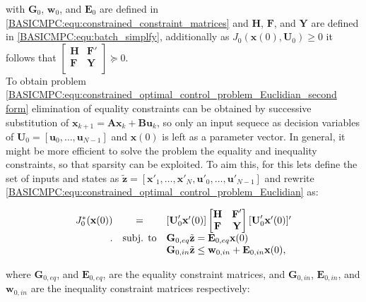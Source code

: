     with $\textbf{G}_0$, $\textbf{w}_0$, and $\textbf{E}_0$ are defined in \ref{BASICMPC:equ:constrained_constraint_matrices} and $\textbf{H}$, $\textbf{F}$, and $\textbf{Y}$ are defined in \ref{BASICMPC:equ:batch_simplfy}, additionally as $J_0(\textbf{x}(0),\textbf{U}_0)\geq 0$ it follows that $\begin{bmatrix}
            \textbf{H}&\textbf{F}'\\
            \textbf{F}&\textbf{Y}\\
            \end{bmatrix}\succeq 0$.\\
    To obtain problem \ref{BASICMPC:equ:constrained_optimal_control_problem_Euclidian_second form} elimination of equality constraints can be obtained by successive substitution of $\textbf{x}_{k+1}=\textbf{Ax}_{k}+\textbf{Bu}_{k}$, so only an input sequece as decision variables of $\textbf{U}_0=[\textbf{u}_0,\dots,\textbf{u}_{N-1}]$ and $\textbf{x}(0)$ is left as a parameter vector. In general, it might be more efficient to solve the problem the equality and inequality constraints, so that sparsity can be exploited. To aim this, for this lets define the set of inputs and states as $\tilde{\textbf{z}}=[\textbf{x}'_1,\dots,\textbf{x}'_N,\textbf{u}'_0,\dots,\textbf{u}'_{N-1}]$ and rewrite \ref{BASICMPC:equ:constrained_optimal_control_problem_Euclidian} as:

    \begin{equation}
    \begin{array}{rcl}
            J^*_0(\textbf{x}(0))
            &=&[\textbf{U}'_0\textbf{x}'(0)]
            \begin{bmatrix}
            \textbf{H}&\textbf{F}'\\
            \textbf{F}&\textbf{Y}\\
            \end{bmatrix}
            [\textbf{U}'_0\textbf{x}'(0)]'\\.
            &\textnormal{subj. to}&\textbf{G}_{0,eq}\tilde{\textbf{z}}=\textbf{E}_{0,eq}\textbf{x}(0)\\
            &&\textbf{G}_{0,in}\tilde{\textbf{z}}\leq\textbf{w}_{0,in}+\textbf{E}_{0,in}\textbf{x}(0),
        \end{array}
        \label{BASICMPC:equ:constrained_Euclidian_mergedconstraint}
    \end{equation}

    where $\textbf{G}_{0,eq}$, and $\textbf{E}_{0,eq}$, are the equality constraint matrices, and  $\textbf{G}_{0,in}$, $\textbf{E}_{0,in}$, and $\textbf{w}_{0,in}$ are the inequality constraint matrices respectively:

